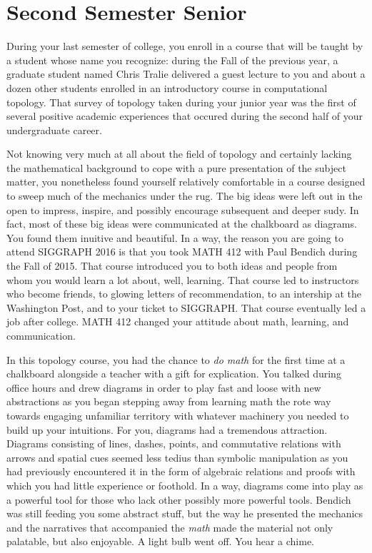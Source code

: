 \documentclass[../main.tex]{subfiles}
\begin{document}
\section{Second Semester Senior}
 
During your last semester of college, you enroll in a course that will be taught by a student whose name you recognize: during the Fall of the previous year, a graduate student named Chris Tralie delivered a guest lecture to you and about a dozen other students enrolled in an introductory course in computational topology. That survey of topology taken during your junior year was the first of several positive academic experiences that occured during the second half of your undergraduate career.

Not knowing very much at all about the field of topology and certainly lacking the mathematical background to cope with a pure presentation of the subject matter, you nonetheless found yourself relatively comfortable in a course designed to sweep much of the mechanics under the rug. The big ideas were left out in the open to impress, inspire, and possibly encourage subsequent and deeper sudy. In fact, most of these big ideas were communicated at the chalkboard as diagrams. You found them inuitive and beautiful. In a way, the reason you are going to attend SIGGRAPH 2016 is that you took MATH 412 with Paul Bendich during the Fall of 2015. That course introduced you to both ideas and people from whom you would learn a lot about, well, learning. That course led to instructors who become friends, to glowing letters of recommendation, to an intership at the Washington Post, and to your ticket to SIGGRAPH. That course eventually led a job after college. MATH 412 changed your attitude about math, learning, and communication.

In this topology course, you had the chance to \textit{do math} for the first time at a chalkboard alongside a teacher with a gift for explication. You talked during office hours and drew diagrams in order to play fast and loose with new abstractions as you began stepping away from learning math the rote way towards engaging unfamiliar territory with whatever machinery you needed to build up your intuitions. For you, diagrams had a tremendous attraction. Diagrams consisting of lines, dashes, points, and commutative relations with arrows and spatial cues seemed less tedius than symbolic manipulation as you had previously encountered it in the form of algebraic relations and proofs with which you had little experience or foothold. In a way, diagrams come into play as a powerful tool for those who lack other possibly more powerful tools. Bendich was still feeding you some abstract stuff, but the way he presented the mechanics and the narratives that accompanied the \textit{math} made the material not only palatable, but also enjoyable. A light bulb went off. You hear a chime.
\end{document}
